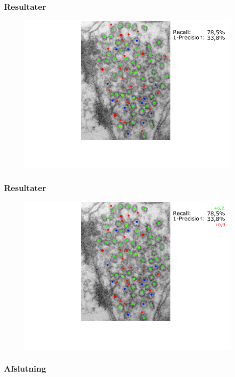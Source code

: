 \documentclass[12pt,t]{beamer}
\begin{document}
\begin{frame}
\frametitle{Resultater}
\begin{figure}[H]
	\centering
	\includegraphics[scale=0.4]{img/afstand/res_4.png}
\end{figure}
\end{frame}

\begin{frame}
\frametitle{Resultater}
\begin{figure}[H]
	\centering
	\includegraphics[scale=0.4]{img/afstand/res_5.png}
\end{figure}
\end{frame}

\begin{frame}
\frametitle{Afslutning}
\end{frame}
\end{document}
